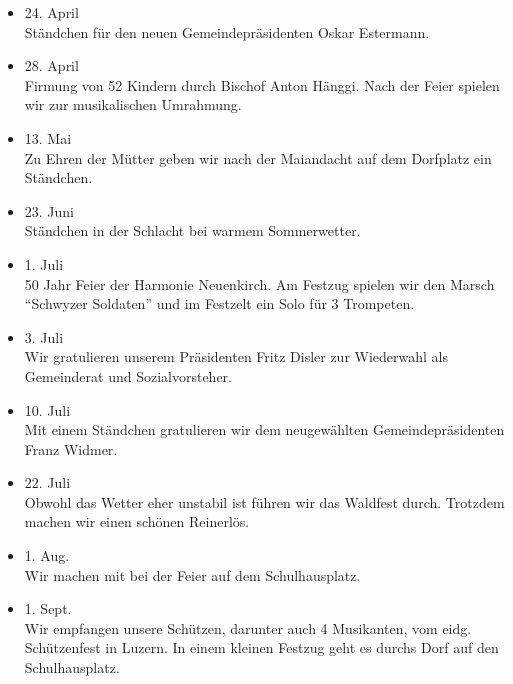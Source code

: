 \begin{history}
\begin{itemize}
        \item 24. April\\
              Ständchen für den neuen Gemeindepräsidenten Oskar Estermann.

        \item 28. April\\
              Firmung von 52 Kindern durch Bischof Anton Hänggi. Nach der Feier
              spielen wir zur musikalischen Umrahmung.

        \item 13. Mai\\
              Zu Ehren der Mütter geben wir nach der Maiandacht auf dem Dorfplatz ein
              Ständchen.

        \item 23. Juni\\
              Ständchen in der Schlacht bei warmem Sommerwetter.

        \item 1. Juli\\
              50 Jahr Feier der Harmonie Neuenkirch. Am Festzug spielen wir den Marsch
              \enquote{Schwyzer Soldaten} und im Festzelt ein Solo für 3 Trompeten.

        \item 3. Juli\\
              Wir gratulieren unserem Präsidenten Fritz Disler zur Wiederwahl als
              Gemeinderat und Sozialvorsteher.

        \item 10. Juli\\
              Mit einem Ständchen gratulieren wir dem neugewählten Gemeindepräsidenten
              Franz Widmer.

        \item 22. Juli\\
              Obwohl das Wetter eher unstabil ist führen wir das Waldfest durch.
              Trotzdem machen wir einen schönen Reinerlös.

        \item 1. Aug.\\
              Wir machen mit bei der Feier auf dem Schulhausplatz.

        \item 1. Sept.\\
              Wir empfangen unsere Schützen, darunter auch 4 Musikanten, vom eidg.
              Schützenfest in Luzern. In einem kleinen Festzug geht es durchs Dorf auf
              den Schulhausplatz.


\end{itemize}
\end{history}
